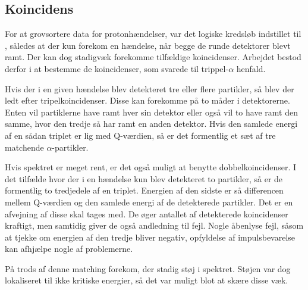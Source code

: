 \subsection{Koincidens}
\label{sec:koincidens}
For at grovsortere data for protonhændelser, var det logiske kredsløb indstillet til \lAND, således
at der kun forekom en hændelse, når begge de runde detektorer blevt ramt. Der kan dog stadigvæk
forekomme tilfældige koincidenser. Arbejdet bestod derfor i at bestemme de koincidenser, som svarede
til trippel-$\alpha$ henfald.

Hvis der i en given hændelse blev detekteret tre eller flere partikler, så blev der ledt efter
tripelkoincidenser. Disse kan forekomme på to måder i detektorerne. Enten vil partiklerne have ramt
hver sin detektor eller også vil to have ramt den samme, hvor den tredje så har ramt en anden
detektor. Hvis den samlede energi af en sådan triplet er lig med Q-værdien, så er det formentlig et
sæt af tre matchende $\alpha$-partikler. 

Hvis spektret er meget rent, er det også muligt at benytte dobbelkoincidenser. I det tilfælde hvor
der i en hændelse kun blev detekteret to partikler, så er de formentlig to tredjedele af en
triplet. Energien af den sidste er så differencen mellem Q-værdien og den samlede energi af de
detekterede partikler. Det er en afvejning af disse skal tages med. De øger antallet af detekterede
koincidenser kraftigt, men samtidig giver de også andledning til fejl. Nogle åbenlyse fejl, såsom at
tjekke om energien af den tredje bliver negativ, opfyldelse af impulsbevarelse kan afhjælpe nogle af
problemerne.

På trods af denne matching forekom, der stadig støj i spektret. Støjen var dog lokaliseret til ikke
kritiske energier, så det var muligt blot at skære disse væk.